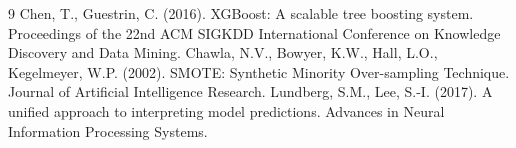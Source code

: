 \documentclass[12pt,a4paper]{article}
\begin{document}
\begin{thebibliography}{9}
 Chen, T., Guestrin, C. (2016). XGBoost: A scalable tree boosting system. Proceedings of the 22nd ACM SIGKDD International Conference on Knowledge Discovery and Data Mining.
 Chawla, N.V., Bowyer, K.W., Hall, L.O., Kegelmeyer, W.P. (2002). SMOTE: Synthetic Minority Over-sampling Technique. Journal of Artificial Intelligence Research.
 Lundberg, S.M., Lee, S.-I. (2017). A unified approach to interpreting model predictions. Advances in Neural Information Processing Systems.
\end{thebibliography}
\end{document}
